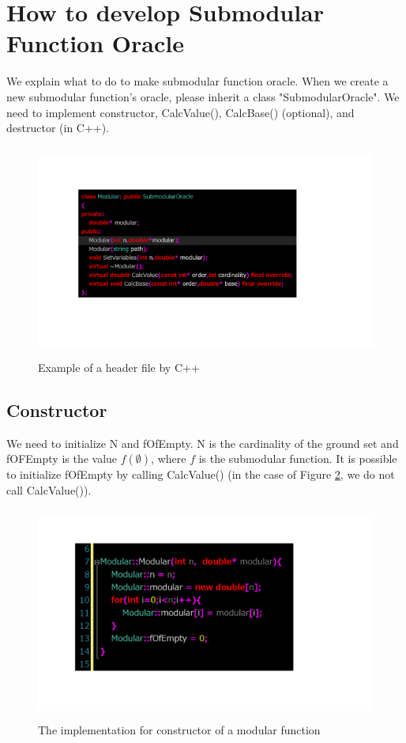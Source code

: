 \documentclass{article}
\begin{document}
\newpage
\section{How to develop Submodular Function Oracle}
We explain what to do to make submodular function oracle.
When we create a new submodular function's oracle,
please inherit a class "SubmodularOracle".
We need to implement constructor, CalcValue(), CalcBase() (optional),
and destructor (in C++).

\begin{figure}[h!]\label{C++OracleDef}
{
\fontsize{10pt}{12pt}\selectfont
\centering
\includegraphics[height=7.0cm]{picture/C++ConstructorOracleDef.png}
\caption{Example of a header file by C++}
}
\end{figure}



\subsection{Constructor}
We need to initialize N and fOfEmpty.
N is the cardinality of the ground set 
and fOFEmpty is the value $f(\emptyset)$, where $f$ is the submodular function.
It is possible to initialize fOfEmpty by calling CalcValue()
(in the case of Figure \ref{C++ConstOracleImp}, we do not call CalcValue()).
\begin{figure}[h!]\label{C++ConstOracleImp}
{
\fontsize{10pt}{12pt}\selectfont
\centering
\includegraphics[height=7.0cm]{picture/C++ConstructorOracleImp.png}
\caption{The implementation for constructor of a modular function}
}
\end{figure}
\end{document}
